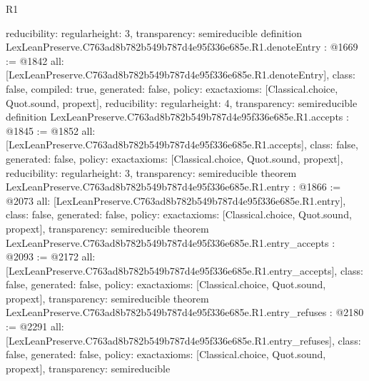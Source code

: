 \begin{lexlean}{R1}
\begin{coremodule}
{  reducibility: regular{height: 3},
  transparency: semireducible
}
definition LexLeanPreserve.C763ad8b782b549b787d4e95f336e685e.R1.denoteEntry : @1669 := @1842 {
  all: [LexLeanPreserve.C763ad8b782b549b787d4e95f336e685e.R1.denoteEntry],
  class: false,
  compiled: true,
  generated: false,
  policy: exact{axioms: [Classical.choice, Quot.sound, propext]},
  reducibility: regular{height: 4},
  transparency: semireducible
}
definition LexLeanPreserve.C763ad8b782b549b787d4e95f336e685e.R1.accepts : @1845 := @1852 {
  all: [LexLeanPreserve.C763ad8b782b549b787d4e95f336e685e.R1.accepts],
  class: false,
  generated: false,
  policy: exact{axioms: [Classical.choice, Quot.sound, propext]},
  reducibility: regular{height: 3},
  transparency: semireducible
}
theorem LexLeanPreserve.C763ad8b782b549b787d4e95f336e685e.R1.entry : @1866 := @2073 {
  all: [LexLeanPreserve.C763ad8b782b549b787d4e95f336e685e.R1.entry],
  class: false,
  generated: false,
  policy: exact{axioms: [Classical.choice, Quot.sound, propext]},
  transparency: semireducible
}
theorem LexLeanPreserve.C763ad8b782b549b787d4e95f336e685e.R1.entry_accepts : @2093 := @2172 {
  all: [LexLeanPreserve.C763ad8b782b549b787d4e95f336e685e.R1.entry_accepts],
  class: false,
  generated: false,
  policy: exact{axioms: [Classical.choice, Quot.sound, propext]},
  transparency: semireducible
}
theorem LexLeanPreserve.C763ad8b782b549b787d4e95f336e685e.R1.entry_refuses : @2180 := @2291 {
  all: [LexLeanPreserve.C763ad8b782b549b787d4e95f336e685e.R1.entry_refuses],
  class: false,
  generated: false,
  policy: exact{axioms: [Classical.choice, Quot.sound, propext]},
  transparency: semireducible
}


\end{coremodule}
\end{lexlean}
